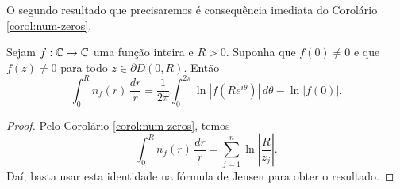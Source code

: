     \noindent
    O segundo resultado que precisaremos é consequência imediata do 
    Corolário \ref{corol:num-zeros}.
    \begin{corolario}
    \label{corol:jensen-com-zeros}
        Sejam $f:\mathbb{C}\to\mathbb{C}$ uma função inteira e $R>0$. Suponha que $f(0)\neq 0$
        e que $f(z)\neq 0$ para todo $z\in\partial D(0,R)$. Então
        \begin{equation*}
            \int_0^R n_f(r) \, \frac{dr}{r}
            = \frac{1}{2\pi} \int_0^{2\pi} \ln|f(Re^{i\theta})| \, d\theta
            - \ln|f(0)|.
        \end{equation*}
    \end{corolario}
    \begin{proof}
       Pelo Corolário \ref{corol:num-zeros}, temos
       \begin{equation*}
           \int_0^R n_f(r) \, \frac{dr}{r} 
           = \sum_{j=1}^n \ln\left|\frac{R}{z_j}\right|.
       \end{equation*}
       Daí, basta usar esta identidade na fórmula de Jensen para obter o resultado.
    \end{proof}

